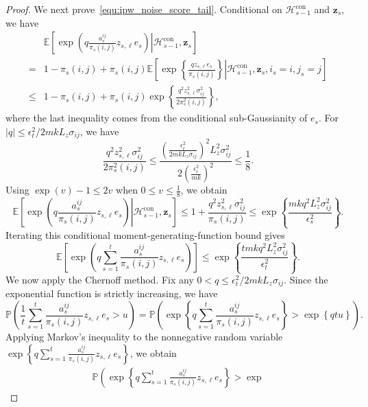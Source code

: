 \documentclass[12pt]{article}
\begin{document}
\begin{proof}
We next prove~\eqref{equ:ipw_noise_score_tail}. Conditional on
$\mathcal H_{s-1}^{\mathrm{con}}$ and $\bm z_s$, we have
\begin{align*}
&
\mathbb E
\left[
\left.
\exp
\left(
q\frac{ a_s^{ij} }{ \pi_s(i,j) } z_{s,\ell} e_s
\right)
\right|
\mathcal H_{s-1}^{\mathrm{con}},
\bm z_s
\right] \\
=&
1-\pi_s(i,j)+ \pi_s(i,j)
\mathbb E
\left[
\left.
\exp
\left\{
\frac{
qz_{s,\ell}e_s}{\pi_s(i,j)}
\right\}
\right|
\mathcal H_{s-1}^{\mathrm{con}},
\bm z_s,i_s=i,j_s=j
\right] \\
\le &
1-\pi_s(i,j)+\pi_s(i,j)
\exp
\left\{
\frac{q^2z_{s,\ell}^2\sigma_{ij}^2}{2\pi_s^2(i,j)}
\right\},
\end{align*}
where the last inequality comes from the conditional sub-Gaussianity of $e_s$. 
For $|q| \le {\epsilon_t^2}/{2mkL_z\sigma_{ij}}$,
we have
\[
\frac{q^2z_{s,\ell}^2\sigma_{ij}^2}{2\pi_s^2(i,j)}
\le
\frac{\left(\frac{\epsilon_t^2}{2mkL_z\sigma_{ij}}\right)^2L_z^2\sigma_{ij}^2}{2\left(\frac{\epsilon_t^2}{mk} \right)^2}
\le \frac18.
\]
Using $\exp(v)-1 \le 2v$ when $0\le v\le\frac18$, we obtain
\begin{equation*}
\mathbb E
\left[
\left.
\exp
\left(
q\frac{ a_s^{ij} }{ \pi_s(i,j) } z_{s,\ell} e_s
\right)
\right|
\mathcal H_{s-1}^{\mathrm{con}},
\bm z_s
\right]
\le
1+\frac{q^2z_{s,\ell}^2\sigma_{ij}^2}{\pi_s(i,j)}
\le
\exp
\left\{
\frac{mk q^2L_z^2\sigma_{ij}^2}{\epsilon_s^2}
\right\}.
\end{equation*}
Iterating this conditional moment-generating-function bound gives
\[
\mathbb E
\left[
\exp
\left(
q\sum_{s=1}^t
\frac{ a_s^{ij} }{ \pi_s(i,j) } z_{s,\ell} e_s
\right)
\right]
\le
\exp
\left\{
\frac{tmkq^2L_z^2\sigma_{ij}^2}{\epsilon_t^2}
\right\}.
\]
We now apply the Chernoff method. Fix any $0<q\le {\epsilon_t^2}/{2mkL_z\sigma_{ij}}$.
Since the exponential function is strictly increasing, we have
\begin{equation*}
\mathbb P
\left(
\frac{1}{t}
\sum_{s=1}^t
\frac{ a_s^{ij} }{ \pi_s(i,j) } z_{s,\ell} e_s
>u\right)=
\mathbb P
\left(
\exp
\left\{q
\sum_{s=1}^t
\frac{ a_s^{ij} }{ \pi_s(i,j) } z_{s,\ell} e_s
\right\}
>
\exp\left\{qtu\right\}\right).
\end{equation*}
Applying Markov's inequality to the nonnegative random variable $\exp
\left\{
q\sum_{s=1}^t
\frac{ a_s^{ij} }{ \pi_s(i,j) } z_{s,\ell} e_s
\right\}$,
we obtain
\begin{align*}
\mathbb P
\left(
\exp
\left\{
q\sum_{s=1}^t
\frac{ a_s^{ij} }{ \pi_s(i,j) } z_{s,\ell} e_s
\right\}
>
\exp

\end{align*}
\end{proof}
\end{document}
